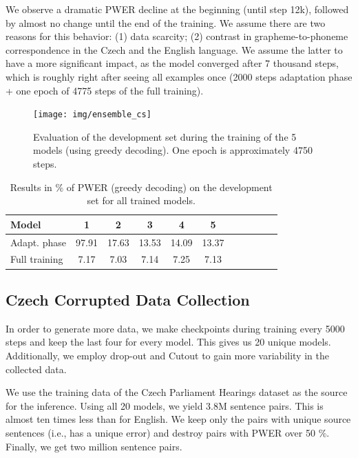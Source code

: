 We observe a dramatic PWER decline at the beginning (until step 12k), followed by almost no change until the end of the training. We assume there are two reasons for this behavior: (1) data scarcity; (2) contrast in grapheme-to-phoneme correspondence in the Czech and the English language. We assume the latter to have a more significant impact, as the model converged after 7 thousand steps, which is roughly right after seeing all examples once (2000 steps adaptation phase + one epoch of 4775 steps of the full training).

\begin{figure}[h]
	\texttt{[image: img/ensemble\_cs]}
	\caption[Czech ensemble training]{Evaluation of the development set during the training of the 5 models (using greedy decoding). One epoch is approximately 4750 steps.}
	\label{fig:ensemble_training_cs}
\end{figure}

\begin{table}[h]
	\centering
	\begin{tabular}{l|cccccccccc}
		\bf Model & \bf 1 & \bf 2 & \bf 3 & 4 & \bf 5  \\
		\hline 
		
		Adapt. phase &
		97.91 &
		17.63 &
		13.53 &
		14.09 &
		13.37 \\
		Full training &
		7.17 &
		7.03 &
		7.14 &
		7.25 &
		7.13 
		
	\end{tabular}
	\caption[Czech ensemble final performance]{Results in \% of PWER (greedy decoding) on the development set for all trained models.}
	\label{tab:cs_folds}
\end{table}

\subsection{Czech Corrupted Data Collection}
In order to generate more data, we make checkpoints during training every 5000 steps and keep the last four for every model. This gives us 20 unique models. Additionally, we employ drop-out and Cutout to gain more variability in the collected data.

We use the training data of the Czech Parliament Hearings dataset as the source for the inference. Using all 20 models, we yield 3.8M sentence pairs. This is almost ten times less than for English. We keep only the pairs with unique source sentences (i.e., has a unique error) and destroy pairs with PWER over 50 \%. Finally, we get two million sentence pairs.

